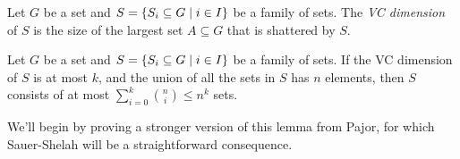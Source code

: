     \begin{definition} \label{def:VC_dimension}
        Let $G$ be a set and $S = \{ S_i \subseteq G \mid i \in I \}$ be a family of sets.
        The \emph{VC dimension} of $S$ is the size of the largest set $A \subseteq G$ that is shattered by $S$.
    \end{definition}

    \begin{lemma} \label{lem:sauer-shelah}
        Let $G$ be a set and $S = \{ S_i \subseteq G \mid i \in I \}$ be a family of sets.
        If the VC dimension of $S$ is at most $k$, and the union of all the sets in $S$ has $n$ elements, then
        $S$ consists of at most $\sum_{i=0}^{k} \binom{n}{i} \leq n^k$ sets.
    \end{lemma}

    We'll begin by proving a stronger version of this lemma from Pajor, for which Sauer-Shelah will be a straightforward
    consequence.

